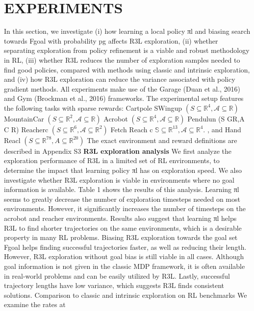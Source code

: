 \documentclass{article}
\begin{document}
\section{EXPERIMENTS}
In this section, we investigate (i) how learning a local policy πl and biasing search towards Fgoal with
probability pg affects R3L exploration, (ii) whether separating exploration from policy refinement
is a viable and robust methodology in RL, (iii) whether R3L reduces the number of exploration
samples needed to find good policies, compared with methods using classic and intrinsic exploration,
and (iv) how R3L exploration can reduce the variance associated with policy gradient methods.
All experiments make use of the Garage (Duan et al., 2016) and Gym (Brockman et al., 2016)
frameworks. The experimental setup features the following tasks with sparse rewards: Cartpole
SWingup $(S\subseteq\mathbb{R}^{4},{\mathcal{A}}\subseteq\mathbb{R})$ MountainCar $(S\subseteq\mathbb{R}^{2},{\mathcal{A}}\subseteq\mathbb{R})$ Acrobot $(S\subseteq\mathbb{R}^{4},{\mathcal{A}}\subseteq\mathbb{R})$ Pendulun (S GR,A C R) Reacherc $(S\subseteq\mathbb{R}^{6},{\mathcal{A}}\subseteq\mathbb{R}^{2})$ Fetch Reach c $\mathbb{S}\subseteq\mathbb{R}^{13},{\mathcal{A}}\subseteq\mathbb{R}^{4}.$ , and Hand Reacl $(S\subseteq\mathbb{R}^{78},A\subseteq\mathbb{R}^{20})$ The exact environment and reward definitions are described in Appendix S3
\textbf{R3L exploration analysis} We first analyze the exploration performance of R3L in a limited set of
RL environments, to determine the impact that learning policy πl has on exploration speed. We also
investigate whether R3L exploration is viable in environments where no goal information is available.
Table 1 shows the results of this analysis. Learning πl seems to greatly decrease the number of
exploration timesteps needed on most environments. However, it significantly increases the number
of timesteps on the acrobot and reacher environments. Results also suggest that learning πl helps
R3L to find shorter trajectories on the same environments, which is a desirable property in many RL
problems. Biasing R3L exploration towards the goal set Fgoal helps finding successful trajectories
faster, as well as reducing their length. However, R3L exploration without goal bias is still viable in
all cases. Although goal information is not given in the classic MDP framework, it is often available
in real-world problems and can be easily utilized by R3L. Lastly, successful trajectory lengths have
low variance, which suggests R3L finds consistent solutions.
Comparison to classic and intrinsic exploration on RL benchmarks We examine the rates at
\end{document}
